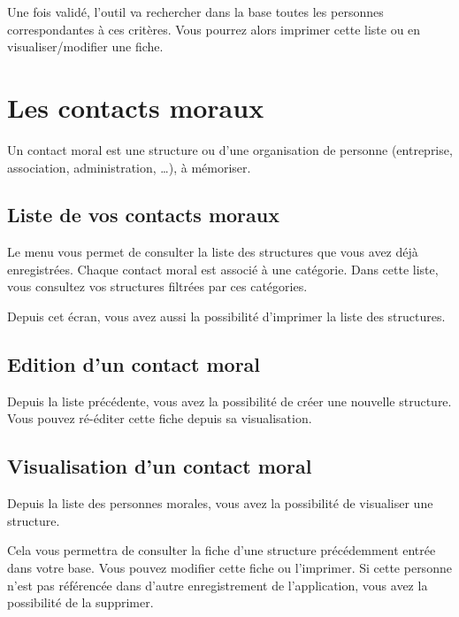 \documentclass[a4paper,10pt,oneside,french]{sphinxmanual}
\begin{document}
Une fois validé, l’outil va rechercher dans la base toutes les personnes correspondantes à ces critères. Vous pourrez alors imprimer cette liste ou en visualiser/modifier une fiche.

\noindent{}


\section{Les contacts moraux}
\label{\detokenize{contacts/legal_entity:les-contacts-moraux}}\label{\detokenize{contacts/legal_entity::doc}}
Un contact moral est une structure ou d’une organisation de personne (entreprise, association, administration, …), à mémoriser.


\subsection{Liste de vos contacts moraux}
\label{\detokenize{contacts/legal_entity:liste-de-vos-contacts-moraux}}
Le menu  vous permet de consulter la liste des structures que vous avez déjà enregistrées. Chaque contact moral est associé à une catégorie. Dans cette liste, vous consultez vos structures filtrées par ces catégories.

Depuis cet écran, vous avez aussi la possibilité d’imprimer la liste des structures.

\noindent{}


\subsection{Edition d’un contact moral}
\label{\detokenize{contacts/legal_entity:edition-d-un-contact-moral}}
Depuis la liste précédente, vous avez la possibilité de créer une nouvelle structure. Vous pouvez ré-éditer cette fiche depuis sa visualisation.

\noindent{}


\subsection{Visualisation d’un contact moral}
\label{\detokenize{contacts/legal_entity:visualisation-d-un-contact-moral}}
Depuis la liste des personnes morales, vous avez la possibilité de visualiser une structure.

Cela vous permettra de consulter la fiche d’une structure précédemment entrée dans votre base. Vous pouvez modifier cette fiche ou l’imprimer. Si cette personne n’est pas référencée dans d’autre enregistrement de l’application, vous avez la possibilité de la supprimer.
\end{document}
